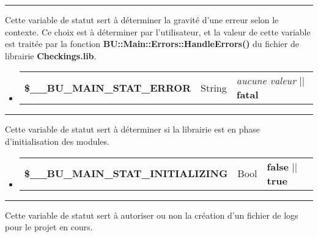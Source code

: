 \documentclass[a4paper,10pt]{article}
\begin{document}
\par\noindent\rule{\textwidth}{0.4pt}

\begin{justify}
    Cette variable de statut sert à déterminer la gravité d'une erreur selon le contexte. Ce choix est à déterminer par l'utilisateur, et la valeur de cette variable est traitée par la fonction \textbf{\color{mauve}BU::Main::Errors::HandleErrors()} du fichier de librairie \textbf{\color{lime}Checkings.lib}.
\end{justify}

\begin{justify}
     \begin{itemize}
        \item
        {
            \begin{tabular}{l|l|l}
                \textbf{\color{vars}\$\_\_BU\_MAIN\_STAT\_ERROR}  & String    & \textit{aucune valeur} || \textbf{fatal}\\[1\baselineskip]
            \end{tabular}
        }
    \end{itemize}
\end{justify}


\par\noindent\rule{\textwidth}{0.4pt}

\begin{justify}
    Cette variable de statut sert à déterminer si la librairie est en phase d'initialisation des modules.
\end{justify}

\begin{justify}
     \begin{itemize}
        \item
        {
            \begin{tabular}{l|l|l}
                \textbf{\color{vars}\$\_\_BU\_MAIN\_STAT\_INITIALIZING}       & Bool  & \textbf{false} || \textbf{true}\\[1\baselineskip]
            \end{tabular}
        }
    \end{itemize}
\end{justify}


\par\noindent\rule{\textwidth}{0.4pt}

\begin{justify}
    Cette variable de statut sert à autoriser ou non la création d'un fichier de logs pour le projet en cours.
\end{justify}
\end{document}
